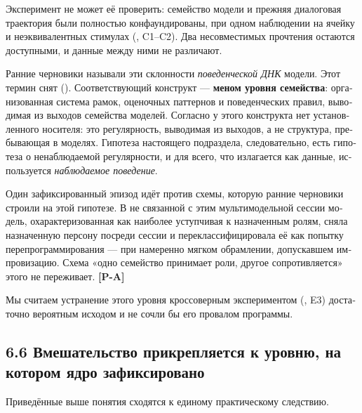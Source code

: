 \begin{russian}
Эксперимент не может её проверить: семейство модели и прежняя диалоговая траектория были полностью конфаундированы, при одном наблюдении на ячейку и неэквивалентных стимулах (, C1–C2). Два несовместимых прочтения остаются доступными, и данные между ними не различают.

Ранние черновики называли эти склонности \emph{поведенческой ДНК} модели. Этот термин снят (). Соответствующий конструкт — \textbf{меном уровня семейства}: организованная система рамок, оценочных паттернов и поведенческих правил, выводимая из выходов семейства моделей. Согласно  у этого конструкта нет установленного носителя: это регулярность, выводимая из выходов, а не структура, пребывающая в моделях. Гипотеза настоящего подраздела, следовательно, есть гипотеза о ненаблюдаемой регулярности, и для всего, что излагается как данные, используется \emph{наблюдаемое поведение}.

Один зафиксированный эпизод идёт против схемы, которую ранние черновики строили на этой гипотезе. В не связанной с этим мультимодельной сессии модель, охарактеризованная как наиболее уступчивая к назначенным ролям, сняла назначенную персону посреди сессии и переклассифицировала её как попытку перепрограммирования — при намеренно мягком обрамлении, допускавшем импровизацию. Схема «одно семейство принимает роли, другое сопротивляется» этого не переживает. \textbf{[P-A]}

Мы считаем устранение этого уровня кроссоверным экспериментом (, E3) достаточно вероятным исходом и не сочли бы его провалом программы.


\subsection*{6.6 Вмешательство прикрепляется к уровню, на котором ядро зафиксировано}
\label{sec:ru:6.6}

Приведённые выше понятия сходятся к единому практическому следствию.


\end{russian}
